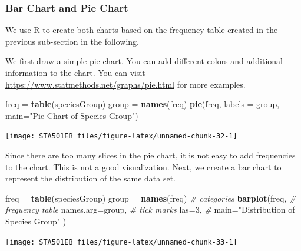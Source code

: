 \documentclass[
]{book}
\newenvironment{Shaded}{\begin{snugshade}}{\end{snugshade}}
\newcommand{\AttributeTok}[1]{\textcolor[rgb]{0.13,0.29,0.53}{#1}}
\newcommand{\CommentTok}[1]{\textcolor[rgb]{0.56,0.35,0.01}{\textit{#1}}}
\newcommand{\DecValTok}[1]{\textcolor[rgb]{0.00,0.00,0.81}{#1}}
\newcommand{\FunctionTok}[1]{\textcolor[rgb]{0.13,0.29,0.53}{\textbf{#1}}}
\newcommand{\NormalTok}[1]{#1}
\newcommand{\OtherTok}[1]{\textcolor[rgb]{0.56,0.35,0.01}{#1}}
\newcommand{\StringTok}[1]{\textcolor[rgb]{0.31,0.60,0.02}{#1}}
\begin{document}
\hypertarget{bar-chart-and-pie-chart}{%
\subsubsection{Bar Chart and Pie Chart}\label{bar-chart-and-pie-chart}}

We use R to create both charts based on the frequency table created in the previous sub-section in the following.

We first draw a simple pie chart. You can add different colors and additional information to the chart. You can visit \url{https://www.statmethods.net/graphs/pie.html} for more examples.

\begin{Shaded}
\begin{Highlighting}[]
\NormalTok{freq }\OtherTok{=} \FunctionTok{table}\NormalTok{(speciesGroup)}
\NormalTok{group }\OtherTok{=} \FunctionTok{names}\NormalTok{(freq)}
\FunctionTok{pie}\NormalTok{(freq, }\AttributeTok{labels =}\NormalTok{ group, }\AttributeTok{main=}\StringTok{"Pie Chart of Species Group"}\NormalTok{)}
\end{Highlighting}
\end{Shaded}

\begin{center}\texttt{[image: STA501EB\_files/figure-latex/unnamed-chunk-32-1]} \end{center}

Since there are too many slices in the pie chart, it is not easy to add frequencies to the chart. This is not a good visualization. Next, we create a bar chart to represent the distribution of the same data set.

\begin{Shaded}
\begin{Highlighting}[]
\NormalTok{freq }\OtherTok{=} \FunctionTok{table}\NormalTok{(speciesGroup)}
\NormalTok{group }\OtherTok{=} \FunctionTok{names}\NormalTok{(freq)         }\CommentTok{\# categories}
\FunctionTok{barplot}\NormalTok{(freq,               }\CommentTok{\# frequency table}
        \AttributeTok{names.arg=}\NormalTok{group,    }\CommentTok{\# tick marks}
        \AttributeTok{las=}\DecValTok{3}\NormalTok{,              }\CommentTok{\# }
        \AttributeTok{main=}\StringTok{"Distribution of Species Group"}\NormalTok{ )}
\end{Highlighting}
\end{Shaded}

\begin{center}\texttt{[image: STA501EB\_files/figure-latex/unnamed-chunk-33-1]} \end{center}
\end{document}
